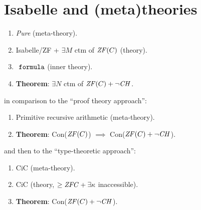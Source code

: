 \section{Isabelle and (meta)theories}
\label{sec:isabelle-metatheories}

\begin{enumerate}
\item \emph{Pure} (meta-theory).
\item Isabelle/ZF + $\exists M$ ctm of $\mathit{ZF}(C)$ (theory). 
\item $\formula$ (inner theory).
\item \textbf{Theorem}: $\exists N$ ctm of $\mathit{ZF}(C)+\neg\mathit{CH}$.
\end{enumerate}

in comparison to the ``proof theory approach'':

\begin{enumerate}
\item Primitive recursive arithmetic (meta-theory).
\item \textbf{Theorem}: Con($\mathit{ZF}(C)$) $\implies$ Con($\mathit{ZF}(C)+\neg\mathit{CH}$).
\end{enumerate}

and then to the ``type-theoretic approach'':

\begin{enumerate}
\item CiC (meta-theory).
\item CiC (theory, $\geq \mathit{ZFC} + \exists \kappa$ inaccessible).
\item \textbf{Theorem}: Con($\mathit{ZF}(C)+\neg\mathit{CH}$).
\end{enumerate}

